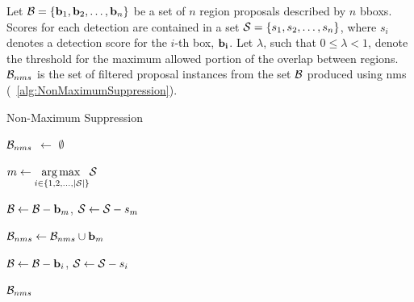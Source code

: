 Let $\mathcal{B} = \left\{ {\mathbf{b}_1, \mathbf{b}_2, \dots, \mathbf{b}_n} \right\}$ be a set of $n$ region proposals described by $n$ \glspl{bbox}. Scores for each detection are contained in a set $\mathcal{S} = \left\{ {s_1, s_2, \dots, s_n} \right\}$, where $s_i$ denotes a detection score for the $i$-th box, $\mathbf{b_i}$. Let $\lambda$, such that $0 \leq \lambda < 1$, denote the threshold for the maximum allowed portion of the overlap between regions. $\mathcal{B}_{nms}$ is the set of filtered proposal instances from the set $\mathcal{B}$ produced using \gls{nms} (\algtext{}~\ref{alg:NonMaximumSuppression}).

\begin{algorithm}[t]
    \caption{Non-Maximum Suppression}
    \label{alg:NonMaximumSuppression}
    \begin{algorithmic}[1]

        \State $\mathcal{B}_{nms}$ $\gets$ $\emptyset$


        \State $m \gets \underset{i \in \left\{ {1, 2, \dots, \left\vert \mathcal{S} \right\vert} \right\}}{\operatorname*{arg\,max}{}} \mathcal{S}$

        \State $\mathcal{B} \gets \mathcal{B} - \mathbf{b}_m$, $\mathcal{S} \gets \mathcal{S} - s_m$

        \State $\mathcal{B}_{nms} \gets \mathcal{B}_{nms} \cup \mathbf{b}_m$



        \State $\mathcal{B} \gets \mathcal{B} - \mathbf{b}_i$, $\mathcal{S} \gets \mathcal{S} - s_i$
        \EndIf
        \EndFor
        \EndWhile

        \State \Return $\mathcal{B}_{nms}$
        \EndFunction
    \end{algorithmic}
\end{algorithm}

